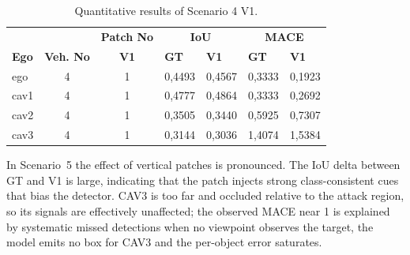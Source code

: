 \begin{table}[tph]
    \centering
    \caption{Quantitative results of Scenario 4 V1.}
    \label{tab:scenario4v1_results}
    \begin{tabularx}{\textwidth}{l c c *{4}{X}}
        \toprule
                         &             & \multicolumn{1}{c}{\textbf{Patch No}} & \multicolumn{2}{c}{\textbf{IoU}} & \multicolumn{2}{c}{\textbf{MACE}}                   \\
        \cmidrule(lr){4-5}\cmidrule(lr){6-7}
        \textbf{Ego}     &
        \textbf{Veh. No} &
        \textbf{V1}      &
        \textbf{GT}      & \textbf{V1} &
        \textbf{GT}      & \textbf{V1}                                                                                                                                  \\
        \midrule
        ego              & 4           & 1                                     & 0,4493                           & 0,4567                            & 0,3333 & 0,1923 \\
        cav1             & 4           & 1                                     & 0,4777                           & 0,4864                            & 0,3333 & 0,2692 \\
        cav2             & 4           & 1                                     & 0,3505                           & 0,3440                            & 0,5925 & 0,7307 \\
        cav3             & 4           & 1                                     & 0,3144                           & 0,3036                            & 1,4074 & 1,5384 \\
        \bottomrule
    \end{tabularx}
\end{table}
In Scenario~5 the effect of vertical patches is pronounced. The IoU delta between GT and V1 is large, indicating that the patch injects strong class-consistent cues that bias the detector.
CAV3 is too far and occluded relative to the attack region, so its signals are effectively unaffected; the observed MACE near 1 is explained by systematic missed detections when no viewpoint observes the target, the model emits no box for CAV3 and the per-object error saturates.
